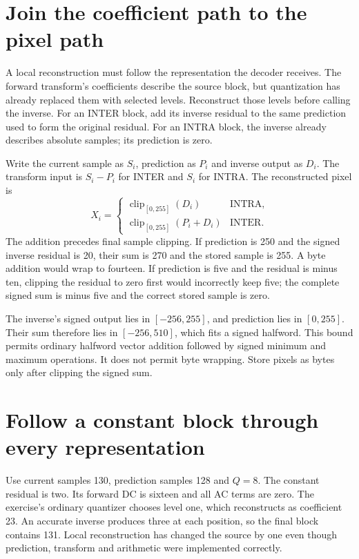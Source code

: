 \section{Join the coefficient path to the pixel path}
A local reconstruction must follow the representation the decoder receives.
The forward transform's coefficients describe the source block, but quantization
has already replaced them with selected levels. Reconstruct those levels before
calling the inverse. For an INTER block, add its inverse residual to the same
prediction used to form the original residual. For an INTRA block, the inverse
already describes absolute samples; its prediction is zero.

Write the current sample as $S_i$, prediction as $P_i$ and inverse output as $D_i$.
The transform input is $S_i-P_i$ for INTER and $S_i$ for INTRA. The reconstructed
pixel is
\[
  X_i=\begin{cases}
    \operatorname{clip}_{[0,255]}(D_i)     & \text{INTRA}, \\
    \operatorname{clip}_{[0,255]}(P_i+D_i) & \text{INTER}.
  \end{cases}
\]
The addition precedes final sample clipping. If prediction is 250 and the signed
inverse residual is 20, their sum is 270 and the stored sample is 255. A byte
addition would wrap to fourteen. If prediction is five and the residual is
minus ten, clipping the residual to zero first would incorrectly keep five;
the complete signed sum is minus five and the correct stored sample is zero.

The inverse's signed output lies in $[-256,255]$, and prediction lies in
$[0,255]$. Their sum therefore lies in $[-256,510]$, which fits a signed halfword.
This bound permits ordinary halfword vector addition followed by signed minimum
and maximum operations. It does not permit byte wrapping. Store pixels as bytes
only after clipping the signed sum.

\section{Follow a constant block through every representation}
Use current samples 130, prediction samples 128 and $Q=8$. The constant residual
is two. Its forward DC is sixteen and all AC terms are zero. The exercise's
ordinary quantizer chooses level one, which reconstructs as coefficient 23.
An accurate inverse produces three at each position, so the final block contains
131. Local reconstruction has changed the source by one even though prediction,
transform and arithmetic were implemented correctly.


